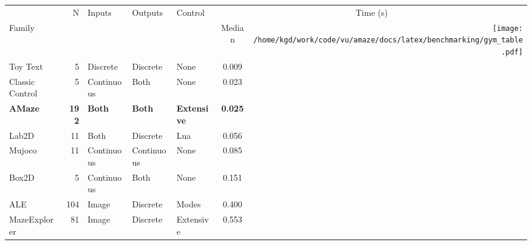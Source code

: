 \documentclass{standalone}
\begin{document}
\newlength{\img}%
\setlength{\img}{9.2\baselineskip}%
\begin{tabular}{lrlllc@{ }r@{}}
\toprule
 &\multirow{2}{*}{ N }&\multirow{2}{*}{ Inputs }&\multirow{2}{*}{ Outputs }&\multirow{2}{*}{ Control }& \multicolumn{2}{c}{Time (s)} \\ 
\cmidrule(lr){6-7}
Family &  &  &  &  & Median &
 \multirow{9.77}{*}{\texttt{[image: /home/kgd/work/code/vu/amaze/docs/latex/benchmarking/gym\_table.pdf]}} \\
\midrule
Toy Text & 5 & Discrete & Discrete & None & 0.009 \\
Classic Control & 5 & Continuous & Both & None & 0.023 \\
\textbf{AMaze} & \textbf{192} & \textbf{Both} & \textbf{Both} & \textbf{Extensive} & \textbf{0.025 }\\
Lab2D & 11 & Both & Discrete & Lua & 0.056 \\
Mujoco & 11 & Continuous & Continuous & None & 0.085 \\
Box2D & 5 & Continuous & Both & None & 0.151 \\
ALE & 104 & Image & Discrete & Modes & 0.400 \\
MazeExplorer & 81 & Image & Discrete & Extensive & 0.553 \\
\bottomrule
\end{tabular}
\end{document}

